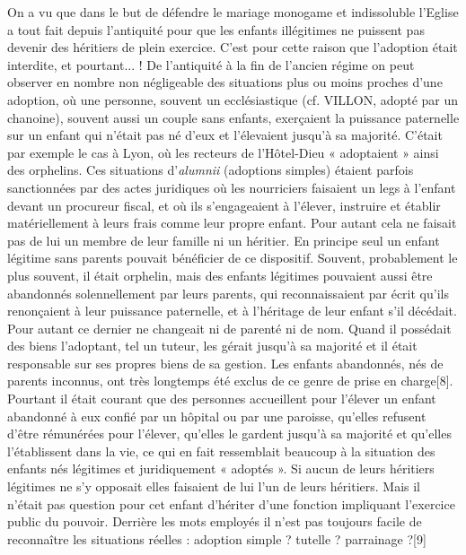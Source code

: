  On a vu que dans le but de défendre le mariage monogame et indissoluble l'Eglise a tout fait depuis l'antiquité pour que les enfants illégitimes ne puissent pas devenir des héritiers de plein exercice. C'est pour cette raison que l'adoption était interdite, et pourtant... ! De l'antiquité à la fin de l'ancien régime on peut observer en nombre non négligeable des situations plus ou moins proches d'une adoption, où une personne, souvent un ecclésiastique (cf. VILLON, adopté par un chanoine), souvent aussi un couple sans enfants, exerçaient la puissance paternelle sur un enfant qui n'était pas né d'eux et l'élevaient jusqu'à sa majorité. C'était par exemple le cas à Lyon, où les recteurs de l'Hôtel-Dieu « adoptaient » ainsi des orphelins. 
 Ces situations d'\emph{alumnii} (adoptions simples) étaient parfois sanctionnées par des actes juridiques où les nourriciers faisaient un legs à l'enfant devant un procureur fiscal, et où ils s'engageaient à l'élever, instruire et établir matériellement à leurs frais comme leur propre enfant. Pour autant cela ne faisait pas de lui un membre de leur famille ni un héritier. 
 En principe seul un enfant légitime sans parents pouvait bénéficier de ce dispositif. Souvent, probablement le plus souvent, il était orphelin, mais des enfants légitimes pouvaient aussi être abandonnés solennellement par leurs parents, qui reconnaissaient par écrit qu'ils renonçaient à leur puissance paternelle, et à l'héritage de leur enfant s'il décédait. Pour autant ce dernier ne changeait ni de parenté ni de nom. Quand il possédait des biens l'adoptant, tel un tuteur, les gérait jusqu'à sa majorité et il était responsable sur ses propres biens de sa gestion. 
 Les enfants abandonnés, nés de parents inconnus, ont très longtemps été exclus de ce genre de prise en charge[8]. Pourtant il était courant que des personnes accueillent pour l'élever un enfant abandonné à eux confié par un hôpital ou par une paroisse, qu'elles refusent d'être rémunérées pour l'élever, qu'elles le gardent jusqu'à sa majorité et qu'elles l'établissent dans la vie, ce qui en fait ressemblait beaucoup à la situation des enfants nés légitimes et juridiquement « adoptés ». Si aucun de leurs héritiers légitimes ne s'y opposait elles faisaient de lui l'un de leurs héritiers. Mais il n'était pas question pour cet enfant d'hériter d'une fonction impliquant l'exercice public du pouvoir. 
 Derrière les mots employés il n'est pas toujours facile de reconnaître les situations réelles : adoption simple ? tutelle ? parrainage ?[9]
 
